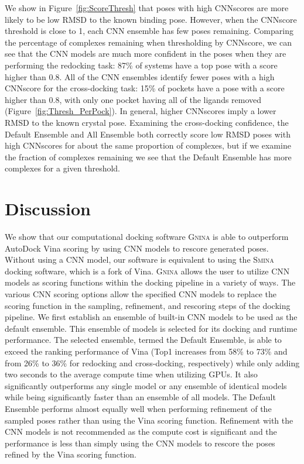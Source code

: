 \documentclass[journal=jcisd8,manuscript=article]{achemso}
\begin{document}
We show in Figure~\ref{fig:ScoreThresh} that poses with high CNNscores are more likely to be low RMSD to the known binding pose. However, when the CNNscore threshold is close to 1, each CNN ensemble has few poses remaining. Comparing the percentage of complexes remaining when thresholding by CNNscore, we can see that the CNN models are much more confident in the poses when they are performing the redocking task: 87\% of systems have a top pose with a score higher than 0.8. All of the CNN ensembles identify fewer poses with a high CNNscore for the cross-docking task: 15\% of pockets have a pose with a score higher than 0.8, with only one pocket having all of the ligands removed (Figure~\ref{fig:Thresh_PerPock}). In general, higher CNNscores imply a lower RMSD to the known crystal pose. Examining the cross-docking confidence, the Default Ensemble and All Ensemble both correctly score low RMSD poses with high CNNscores for about the same proportion of complexes, but if we examine the fraction of complexes remaining we see that the Default Ensemble has more complexes for a given threshold.

\section{Discussion}
We show that our computational docking software \textsc{Gnina} is able to outperform AutoDock Vina scoring by using CNN models to rescore generated poses. Without using a CNN model, our software is equivalent to using the \textsc{Smina} docking software, which is a fork of Vina. \textsc{Gnina} allows the user to utilize CNN models as scoring functions within the docking pipeline in a variety of ways. The various CNN scoring options allow the specified CNN models to replace the scoring function in the sampling, refinement, and rescoring steps of the docking pipeline. We first establish an ensemble of built-in CNN models to be used as the default ensemble. This ensemble of models is selected for its docking and runtime performance. The selected ensemble, termed the Default Ensemble, is able to exceed the ranking performance of Vina (Top1 increases from 58\% to 73\% and from 26\% to 36\% for redocking and cross-docking, respectively) while only adding two seconds to the average compute time when utilizing GPUs. It also significantly outperforms any single model or any ensemble of identical models while being significantly faster than an ensemble of all models. The Default Ensemble performs almost equally well when performing refinement of the sampled poses rather than using the Vina scoring function. Refinement with the CNN models is not recommended as the compute cost is significant and the performance is less than simply using the CNN models to rescore the poses refined by the Vina scoring function.
\end{document}
